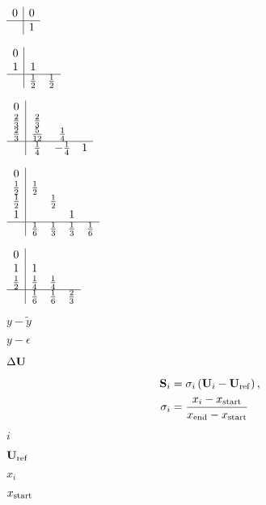 \documentclass{article}
\begin{document}
$\begin{array}{c|c} 0 & 0 \\ \hline & 1 \end{array}$
\pagebreak

$\begin{array}{c|cc} 0 & & \\ 1 & 1 & \\ \hline & \frac{1}{2} & \frac{1}{2}\end{array}$
\pagebreak

$\begin{array}{c|ccc} 0 & & & \\ \frac{2}{3} & \frac{2}{3} & & \\ \frac{2}{3} & \frac{5}{12} & \frac{1}{4} & \\ \hline & \frac{1}{4} & -\frac{1}{4} & 1\end{array}$
\pagebreak

$ \begin{array}{c|cccc} 0 & & & & \\ \frac{1}{2} & \frac{1}{2} & & & \\ \frac{1}{2} & & \frac{1}{2} & & \\ 1 & & & 1 & \\ \hline & \frac{1}{6} & \frac{1}{3} & \frac{1}{3} & \frac{1}{6} \end{array} $
\pagebreak

$ \begin{array}{c|ccc} 0 & & & \\ 1 & 1 & & \\ \frac{1}{2} & \frac{1}{4} & \frac{1}{4} & \\ \hline & \frac{1}{6} & \frac{1}{6} & \frac{2}{3} \end{array}$
\pagebreak

$y-\tilde{y}$
\pagebreak

$y-\epsilon$
\pagebreak

$\Delta {\bf U}$
\pagebreak

\begin{align} {\bf S}_i &= \sigma_i \left( {\bf U}_i - {\bf U}_{\rm ref} \right),\\ \sigma_i &= \frac {x_i - x_{\rm start}} {x_{\rm end} - x_{\rm start}} \end{align}
\pagebreak

$i$
\pagebreak

${\bf U}_{\rm ref}$
\pagebreak

$x_i$
\pagebreak

$x_{\rm start}$
\pagebreak
\end{document}
